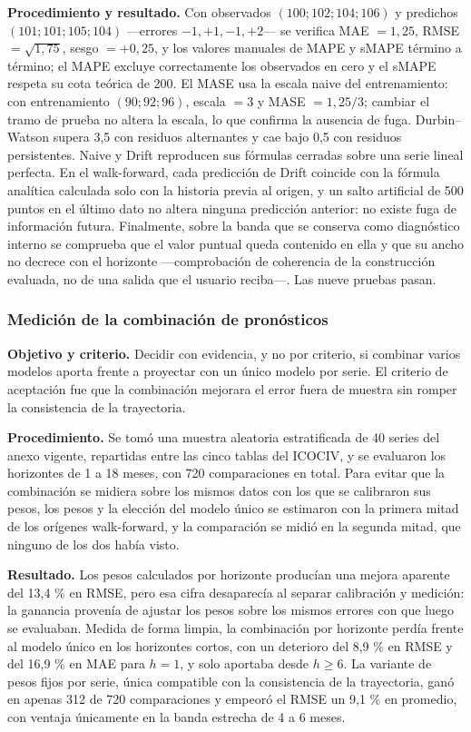 \documentclass[12pt,letterpaper]{article}
\newcommand{\ICOCIV}{ICOCIV}
\begin{document}
\textbf{Procedimiento y resultado.} Con observados \((100; 102; 104; 106)\) y predichos \((101; 101; 105; 104)\) ---errores \(-1, +1, -1, +2\)--- se verifica MAE \(=1{,}25\), RMSE \(=\sqrt{1{,}75}\), sesgo \(=+0{,}25\), y los valores manuales de MAPE y sMAPE término a término; el MAPE excluye correctamente los observados en cero y el sMAPE respeta su cota teórica de 200. El MASE usa la escala naive del entrenamiento: con entrenamiento \((90; 92; 96)\), escala \(=3\) y MASE \(=1{,}25/3\); cambiar el tramo de prueba no altera la escala, lo que confirma la ausencia de fuga. Durbin--Watson supera 3,5 con residuos alternantes y cae bajo 0,5 con residuos persistentes. Naive y Drift reproducen sus fórmulas cerradas sobre una serie lineal perfecta. En el walk-forward, cada predicción de Drift coincide con la fórmula analítica calculada solo con la historia previa al origen, y un salto artificial de 500 puntos en el último dato no altera ninguna predicción anterior: no existe fuga de información futura. Finalmente, sobre la banda que se conserva como diagnóstico interno se comprueba que el valor puntual queda contenido en ella y que su ancho no decrece con el horizonte ---comprobación de coherencia de la construcción evaluada, no de una salida que el usuario reciba---. Las nueve pruebas pasan.

\subsubsection{Medición de la combinación de pronósticos}

\textbf{Objetivo y criterio.} Decidir con evidencia, y no por criterio, si combinar varios modelos aporta frente a proyectar con un único modelo por serie. El criterio de aceptación fue que la combinación mejorara el error fuera de muestra sin romper la consistencia de la trayectoria.

\textbf{Procedimiento.} Se tomó una muestra aleatoria estratificada de 40 series del anexo vigente, repartidas entre las cinco tablas del \ICOCIV, y se evaluaron los horizontes de 1 a 18 meses, con 720 comparaciones en total. Para evitar que la combinación se midiera sobre los mismos datos con los que se calibraron sus pesos, los pesos y la elección del modelo único se estimaron con la primera mitad de los orígenes walk-forward, y la comparación se midió en la segunda mitad, que ninguno de los dos había visto.

\textbf{Resultado.} Los pesos calculados por horizonte producían una mejora aparente del 13,4 \% en RMSE, pero esa cifra desaparecía al separar calibración y medición: la ganancia provenía de ajustar los pesos sobre los mismos errores con que luego se evaluaban. Medida de forma limpia, la combinación por horizonte perdía frente al modelo único en los horizontes cortos, con un deterioro del 8,9 \% en RMSE y del 16,9 \% en MAE para \(h=1\), y solo aportaba desde \(h\geq6\). La variante de pesos fijos por serie, única compatible con la consistencia de la trayectoria, ganó en apenas 312 de 720 comparaciones y empeoró el RMSE un 9,1 \% en promedio, con ventaja únicamente en la banda estrecha de 4 a 6 meses.
\end{document}
